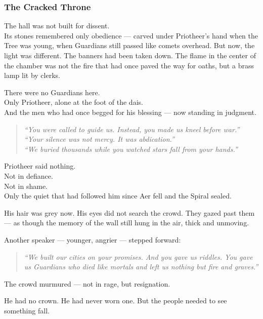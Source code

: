\documentclass[12pt]{article}
\begin{document}
\vspace{.5in}

\subsubsection{The Cracked Throne}

The hall was not built for dissent.\\
Its stones remembered only obedience --- carved under Priotheer’s hand when the Tree was young, when Guardians still passed like comets overhead. But now, the light was different. The banners had been taken down. The flame in the center of the chamber was not the fire that had once paved the way for oaths, but a brass lamp lit by clerks.

There were no Guardians here.\\
Only Priotheer, alone at the foot of the dais.\\
And the men who had once begged for his blessing --- now standing in judgment.

\begin{quote}
\textit{“You were called to guide us. Instead, you made us kneel before war.”}\\
\textit{“Your silence was not mercy. It was abdication.”}\\
\textit{“We buried thousands while you watched stars fall from your hands.”}
\end{quote}

Priotheer said nothing.\\
Not in defiance.\\
Not in shame.\\
Only the quiet that had followed him since Aer fell and the Spiral sealed.

His hair was grey now. His eyes did not search the crowd. They gazed past them --- as though the memory of the wall still hung in the air, thick and unmoving.

Another speaker --- younger, angrier --- stepped forward:

\begin{quote}
\textit{“We built our cities on your promises. And you gave us riddles. You gave us Guardians who died like mortals and left us nothing but fire and graves.”}
\end{quote}

The crowd murmured --- not in rage, but resignation.

He had no crown. He had never worn one. But the people needed to see something fall.
\end{document}
